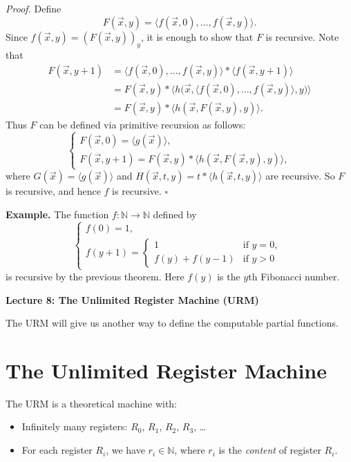 \documentclass[11pt]{article}
\begin{document}
\textit{Proof.} Define
\[
    F(\vec{x}, y) = \langle f(\vec{x}, 0), \dots, f(\vec{x}, y)\rangle.
\]
Since $f(\vec{x}, y) = (F(\vec{x}, y))_y$, it is enough to show that $F$ is recursive. Note that
\begin{align*}
    F(\vec{x}, y+1) &= \langle f(\vec{x}, 0), \dots, f(\vec{x}, y)\rangle * \langle f(\vec{x}, y+1)\rangle \\
                   &= F(\vec{x}, y) * \langle h\bigl(\vec{x}, \langle f(\vec{x}, 0), \dots, f(\vec{x}, y)\rangle, y\bigr)\rangle \\
                   &= F(\vec{x}, y) * \langle h(\vec{x}, F(\vec{x}, y), y)\rangle.
\end{align*}
Thus $F$ can be defined via primitive recursion as follows:
\[
    \begin{cases}
        F(\vec{x}, 0) = \langle g(\vec{x})\rangle, \\
        F(\vec{x}, y+1) = F(\vec{x}, y) * \langle h(\vec{x}, F(\vec{x}, y), y)\rangle,
    \end{cases}
\]
where $G(\vec{x}) = \langle g(\vec{x})\rangle$ and $H(\vec{x}, t, y) = t * \langle h(\vec{x}, t, y)\rangle$ are recursive. So $F$ is recursive, and hence $f$ is recursive. \hfill$\square$

\textbf{Example.} The function $f\colon \mathbb{N} \to \mathbb{N}$ defined by
\[
    \begin{cases}
        f(0) = 1, \\
        f(y+1) = \begin{cases}
            1 & \text{if } y = 0, \\
            f(y) + f(y-1) & \text{if } y > 0
        \end{cases}
    \end{cases}
\]
is recursive by the previous theorem. Here $f(y)$ is the $y$th Fibonacci number.

\newpage

{\LARGE\bfseries Lecture 8: The Unlimited Register Machine (URM)}

The URM will give us another way to define the computable partial functions.

\section{The Unlimited Register Machine}

The URM is a theoretical machine with:
\begin{itemize}[leftmargin=1.6em]
    \item Infinitely many registers: $R_0$, $R_1$, $R_2$, $R_3$, \dots
    \item For each register $R_i$, we have $r_i \in \mathbb{N}$, where $r_i$ is the \emph{content} of register $R_i$.
\end{itemize}
\end{document}
